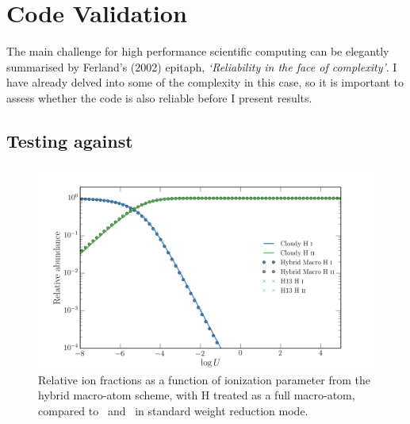 


\section{Code Validation}
\label{sec:code_validation}

The main challenge for high performance scientific computing can be 
elegantly summarised by Ferland's (2002) epitaph, {\sl `Reliability in the face 
of complexity'}. I have already delved into some of the complexity in this case,
so it is important to assess whether the code is also reliable before I present
results. 

\subsection{Testing against \cld}

\begin{figure}
\centering
\includegraphics[width=1.0\textwidth]{figures/03-radtrans/h_comp.png}
\caption
{
Relative ion fractions as a function of ionization parameter from the
hybrid macro-atom scheme, with H treated as a full macro-atom, compared
to \cld\ and \py\ in standard weight reduction mode. 
}
\label{fig:h_cloudy}
\end{figure}

